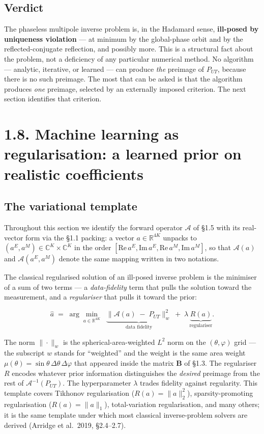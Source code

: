 \documentclass[
  english,
  11pt,
]{report}
\begin{document}
\subsection{Verdict}\label{verdict}

The phaseless multipole inverse problem is, in the Hadamard sense,
\textbf{ill-posed by uniqueness violation} --- at minimum by the
global-phase orbit and by the reflected-conjugate reflection, and
possibly more. This is a structural fact about the problem, not a
deficiency of any particular numerical method. No algorithm ---
analytic, iterative, or learned --- can produce \emph{the} preimage of
\(P_{UT}\), because there is no such preimage. The most that can be
asked is that the algorithm produces \emph{one} preimage, selected by an
externally imposed criterion. The next section identifies that
criterion.

\section{1.8. Machine learning as regularisation: a learned prior on
realistic
coefficients}\label{machine-learning-as-regularisation-a-learned-prior-on-realistic-coefficients}

\subsection{The variational template}\label{the-variational-template}

Throughout this section we identify the forward operator \(\mathcal A\)
of §1.5 with its real-vector form via the §1.1 packing: a vector
\(a \in \mathbb{R}^{4K}\) unpacks to
\((a^E, a^M) \in \mathbb{C}^K \times \mathbb{C}^K\) in the order
\([\mathrm{Re}\,a^E, \mathrm{Im}\,a^E, \mathrm{Re}\,a^M, \mathrm{Im}\,a^M]\),
so that \(\mathcal A(a)\) and \(\mathcal A(a^E, a^M)\) denote the same
mapping written in two notations.

The classical regularised solution of an ill-posed inverse problem is
the minimiser of a sum of two terms --- a \emph{data-fidelity} term that
pulls the solution toward the measurement, and a \emph{regulariser} that
pulls it toward the prior:

\[
\hat a \;=\;\arg\min_{a\in\mathbb{R}^{4K}} \;\;\underbrace{\bigl\|\mathcal{A}(a) \;-\; P_{UT}\bigr\|_{w}^{2}}_{\text{data fidelity}} \;+\; \lambda\,\underbrace{R(a)}_{\text{regulariser}}.
\]

The norm \(\|\cdot\|_w\) is the spherical-area-weighted \(L^2\) norm on
the \((\theta,\varphi)\) grid --- the subscript \(w\) stands for
``weighted'' and the weight is the same area weight
\(\mu(\theta) = \sin\theta\,\Delta\theta\,\Delta\varphi\) that appeared
inside the matrix \(\mathbf B\) of §1.3. The regulariser \(R\) encodes
whatever prior information distinguishes the \emph{desired} preimage
from the rest of \(\mathcal{A}^{-1}(P_{UT})\). The hyperparameter
\(\lambda\) trades fidelity against regularity. This template covers
Tikhonov regularisation (\(R(a) = \|a\|_2^2\)), sparsity-promoting
regularisation (\(R(a) = \|a\|_1\)), total-variation regularisation, and
many others; it is the same template under which most classical
inverse-problem solvers are derived (Arridge et al.~2019, §2.4--2.7).
\end{document}

